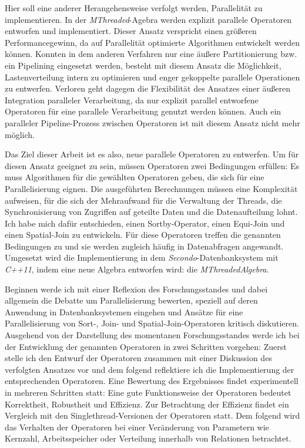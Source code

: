 \documentclass[a4paper,12pt,twoside]{article}
\newcommand{\Fb}[1]{\textit{#1}} %
\begin{document}
Hier soll eine anderer Herangehensweise verfolgt werden, Parallelität zu implementieren. In der \Fb{MThreaded}-Agebra werden explizit parallele Operatoren entworfen und implementiert. Dieser Ansatz verspricht einen größeren Performancegewinn, da auf Parallelität optimierte Algorithmen entwickelt werden können. Konnten in dem anderen Verfahren nur eine äußere Partitionierung bzw. ein Pipelining eingesetzt werden, besteht mit diesem Ansatz die Möglichkeit, Lastenverteilung intern zu optimieren und enger gekoppelte parallele Operationen zu entwerfen. Verloren geht dagegen die Flexibilität des Ansatzes einer äußeren Integration paralleler Verarbeitung, da nur explizit parallel entworfene Operatoren für eine parallele Verarbeitung genutzt werden können. Auch ein paralleler Pipeline-Prozess zwischen Operatoren ist mit diesem Ansatz nicht mehr möglich.

Das Ziel dieser Arbeit ist es also, neue parallele Operatoren zu entwerfen. Um für diesen Ansatz geeignet zu sein, müssen Operatoren zwei Bedingungen erfüllen: Es muss Algorithmen für die gewählten Operatoren geben, die sich für eine Parallelisierung eignen. Die ausgeführten Berechnungen müssen eine Komplexität aufweisen, für die sich der Mehraufwand für die Verwaltung der Threads, die Synchronisierung von Zugriffen auf geteilte Daten und die Datenaufteilung lohnt. Ich habe mich dafür entschieden, einen Sortby-Operator, einen Equi-Join und einen Spatial-Join zu entwickeln. Für diese Operatoren treffen die genannten Bedingungen zu und sie werden zugleich häufig in Datenabfragen angewandt. Umgesetzt wird die Implementierung in dem \Fb{Secondo}-Datenbanksystem mit \Fb{C++11}, indem eine neue Algebra entworfen wird: die \Fb{MThreadedAlgebra}. 

Beginnen werde ich mit einer Reflexion des Forschungsstandes und dabei allgemein die Debatte um Parallelisierung bewerten, speziell auf deren Anwendung in Datenbanksystemen eingehen und Ansätze für eine Parallelisierung von Sort-, Join- und Spatial-Join-Operatoren kritisch diskutieren. Ausgehend von der Darstellung des momentanen Forschungsstandes werde ich bei der Entwicklung der genannten Operatoren in zwei Schritten vorgehen: Zuerst stelle ich den Entwurf der Operatoren zusammen mit einer Diskussion des verfolgten Ansatzes vor und dem folgend reflektiere ich die Implementierung der entsprechenden Operatoren. Eine Bewertung des Ergebnisses findet experimentell in mehreren Schritten statt: Eine gute Funktionsweise der Operatoren bedeutet Korrektheit, Robustheit und Effizienz. Zur Betrachtung der Effizienz findet ein Vergleich mit den Singlethread-Versionen der Operatoren statt. Dem folgend wird das Verhalten der Operatoren bei einer Veränderung von Parametern wie Kernzahl, Arbeitsspeicher oder Verteilung innerhalb von Relationen betrachtet.
\end{document}
